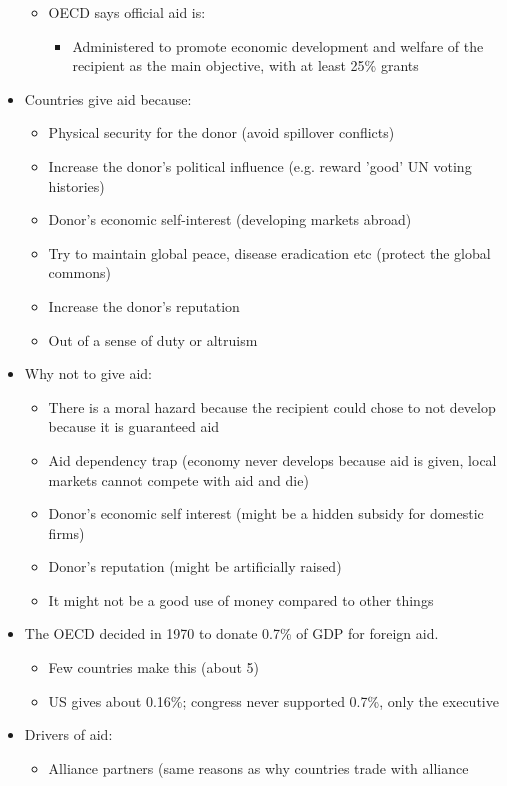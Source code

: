 \documentclass[11pt]{article}
\begin{document}
\begin{itemize}
\begin{itemize}
\item OECD says official aid is:
\begin{itemize}
\item Administered to promote economic development and welfare of the recipient
as the main objective, with at least 25\% grants
\end{itemize}
\end{itemize}
\item Countries give aid because:
\begin{itemize}
\item Physical security for the donor (avoid spillover conflicts)
\item Increase the donor's political influence (e.g. reward 'good' UN voting histories)
\item Donor's economic self-interest (developing markets abroad)
\item Try to maintain global peace, disease eradication etc (protect the global commons)
\item Increase the donor's reputation
\item Out of a sense of duty or altruism
\end{itemize}
\item Why not to give aid:
\begin{itemize}
\item There is a moral hazard because the recipient could chose to not develop
because it is guaranteed aid
\item Aid dependency trap (economy never develops because aid is given, local
markets cannot compete with aid and die)
\item Donor's economic self interest (might be a hidden subsidy for domestic firms)
\item Donor's reputation (might be artificially raised)
\item It might not be a good use of money compared to other things
\end{itemize}
\item The OECD decided in 1970 to donate 0.7\% of GDP for foreign aid.
\begin{itemize}
\item Few countries make this (about 5)
\item US gives about 0.16\%; congress never supported 0.7\%, only the executive
\end{itemize}
\item Drivers of aid:
\begin{itemize}
\item Alliance partners (same reasons as why countries trade with alliance

\end{itemize}
\end{itemize}
\end{document}
